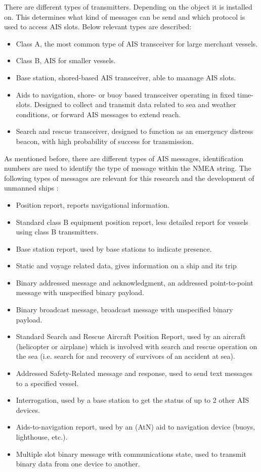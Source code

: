 There are different types of transmitters. Depending on the object it is installed on. This determines what kind of messages can be send and which protocol is used to access \ac{AIS} slots. Below relevant types are described:
\begin{itemize}
	\item Class A, the most common type of \ac{AIS} transceiver for large merchant vessels.
	\item Class B, \ac{AIS} for smaller vessels.
	\item Base station, shored-based \ac{AIS} transceiver, able to maanage \ac{AIS} slots.
	\item Aids to navigation, shore- or buoy based transceiver operating in fixed time-slots. Designed to collect and transmit data related to sea and weather conditions, or forward \ac{AIS} messages to extend reach.
	\item Search and rescue transceiver, designed to function as an emergency distress beacon, with high probability of success for transmission.
\end{itemize}

As mentioned before, there are different types of \ac{AIS} messages, identification numbers are used to identify the type of message within the NMEA string. The following types of messages are relevant for this research and the development of unmanned ships \cite{USCG2018}:
\begin{itemize}
	\item Position report, reports navigational information.
	\item Standard class B equipment position report, less detailed report for vessels using class B transmitters.
	\item Base station report, used by base stations to indicate presence.
	\item Static and voyage related data, gives information on a ship and its trip
	\item Binary addressed message and acknowledgment, an addressed point-to-point message with unspecified binary payload.
	\item Binary broadcast message, broadcast message with unspecified binary payload.
	\item Standard Search and Rescue Aircraft Position Report, used by an aircraft (helicopter or airplane) which is involved with search and rescue operation on the sea (i.e. search for and recovery of survivors of an accident at sea).
	\item Addressed Safety-Related message and response, used to send text messages to a specified vessel.
	\item Interrogation, used by a base station to get the status of up to 2 other AIS devices.
	\item Aids-to-navigation report, used by an (AtN) aid to navigation device (buoys, lighthouse, etc.).
	\item Multiple slot binary message with communications state, used to transmit binary data from one device to another.
\end{itemize}

